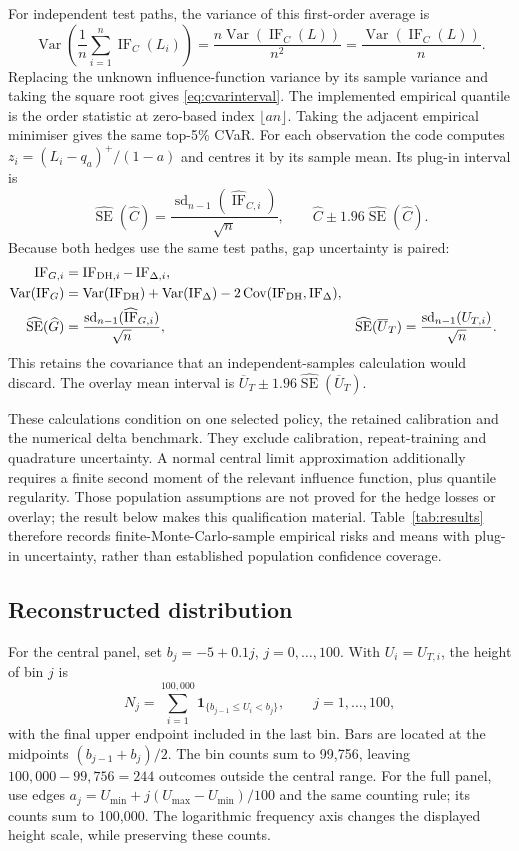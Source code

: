 \documentclass[11pt,a4paper]{article}
\newcommand{\ind}{\mathbf 1}
\newcommand{\SE}{\operatorname{SE}}
\newcommand{\Var}{\operatorname{Var}}
\newcommand{\Cov}{\operatorname{Cov}}
\newcommand{\IF}{\operatorname{IF}}
\newcommand{\sd}{\operatorname{sd}}
\theoremstyle{remark}
\begin{document}
For independent test paths, the variance of this first-order average is
\begin{equation}
 \Var\!\left(\frac1n\sum_{i=1}^n\IF_C(L_i)\right)
 =\frac{n\Var(\IF_C(L))}{n^2}
 =\frac{\Var(\IF_C(L))}{n}.
\end{equation}
Replacing the unknown influence-function variance by its sample variance and taking the square root gives \eqref{eq:cvarinterval}.
The implemented empirical quantile is the order statistic at zero-based index $\lfloor an\rfloor$. Taking the adjacent empirical minimiser gives the same top-5\% CVaR. For each observation the code computes $z_i=(L_i-q_a)^+/(1-a)$ and centres it by its sample mean. Its plug-in interval is
\begin{equation}
 \widehat{\SE}(\widehat C)=\frac{\sd_{n-1}(\widehat{\IF}_{C,i})}{\sqrt n},
 \qquad \widehat C\pm1.96\widehat{\SE}(\widehat C).
 \label{eq:cvarinterval}
\end{equation}
Because both hedges use the same test paths, gap uncertainty is paired:
\begin{align}
 \IF_{G,i}&=\IF_{{\rm DH},i}-\IF_{\Delta,i},\nonumber\\
 \Var(\IF_G)&=\Var(\IF_{\rm DH})+\Var(\IF_\Delta)-2\Cov(\IF_{\rm DH},\IF_\Delta),\nonumber\\
 \widehat{\SE}(\widehat G)&=\frac{\sd_{n-1}(\widehat{\IF}_{G,i})}{\sqrt n},
 &\widehat{\SE}(\overline U_T)&=\frac{\sd_{n-1}(U_{T,i})}{\sqrt n}.
 \label{eq:pairedse}
\end{align}
This retains the covariance that an independent-samples calculation would discard. The overlay mean interval is $\overline U_T\pm1.96\widehat{\SE}(\overline U_T)$.

These calculations condition on one selected policy, the retained calibration and the numerical delta benchmark. They exclude calibration, repeat-training and quadrature uncertainty. A normal central limit approximation additionally requires a finite second moment of the relevant influence function, plus quantile regularity. Those population assumptions are not proved for the hedge losses or overlay; the result below makes this qualification material. Table~\ref{tab:results} therefore records finite-Monte-Carlo-sample empirical risks and means with plug-in uncertainty, rather than established population confidence coverage.

\subsection{Reconstructed distribution}
For the central panel, set $b_j=-5+0.1j$, $j=0,\ldots,100$. With $U_i=U_{T,i}$, the height of bin $j$ is
\begin{equation}
 N_j=\sum_{i=1}^{100,000}\ind_{\{b_{j-1}\leq U_i<b_j\}},
 \qquad j=1,\ldots,100,
\end{equation}
with the final upper endpoint included in the last bin. Bars are located at the midpoints $(b_{j-1}+b_j)/2$. The bin counts sum to 99,756, leaving $100,000-99,756=244$ outcomes outside the central range. For the full panel, use edges $a_j=U_{\min}+j(U_{\max}-U_{\min})/100$ and the same counting rule; its counts sum to 100,000. The logarithmic frequency axis changes the displayed height scale, while preserving these counts.
\end{document}
